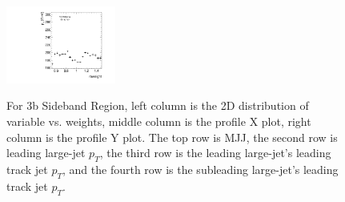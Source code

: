 \begin{figure}[htbp!]
\begin{center}
\includegraphics[width=0.32\textwidth,angle=-90]{figures/boosted/AppendixReweight/Weights/3Trk_Sideband_sublHCand_trk0_Pt_weight_profy.pdf}\\
\caption{For 3b Sideband Region, left column is the 2D distribution of variable vs. weights, middle column is the profile X plot, right column is the profile Y plot. The top row is MJJ, the second row is leading large-\R jet $p_{T}$, the third row is the leading large-\R jet's leading track jet $p_{T}$, and the fourth row is the subleading large-\R jet's leading track jet $p_{T}$.}
\label{fig:app-reweight-dist-3b-SB}
\end{center}
\end{figure}


